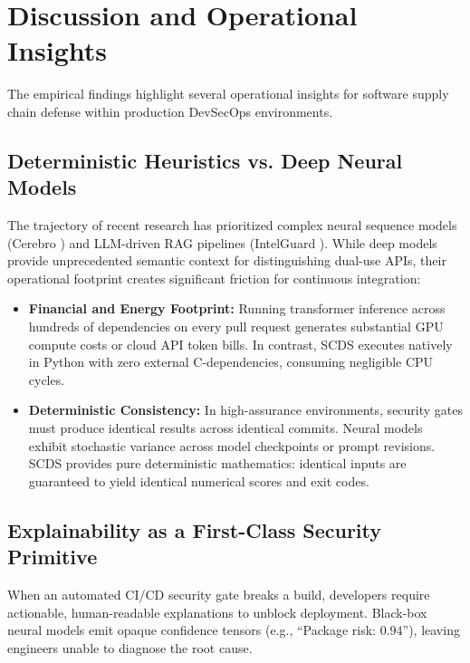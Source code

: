 \section{Discussion and Operational Insights}
\label{sec:discussion}

The empirical findings highlight several operational insights for software supply chain defense within production DevSecOps environments.

\subsection{Deterministic Heuristics vs. Deep Neural Models}
The trajectory of recent research has prioritized complex neural sequence models (Cerebro \cite{zhang2025cerebro}) and LLM-driven RAG pipelines (IntelGuard \cite{guo2026intelguard}). While deep models provide unprecedented semantic context for distinguishing dual-use APIs, their operational footprint creates significant friction for continuous integration:
\begin{itemize}
    \item \textbf{Financial and Energy Footprint:} Running transformer inference across hundreds of dependencies on every pull request generates substantial GPU compute costs or cloud API token bills. In contrast, SCDS executes natively in Python with zero external C-dependencies, consuming negligible CPU cycles.
    \item \textbf{Deterministic Consistency:} In high-assurance environments, security gates must produce identical results across identical commits. Neural models exhibit stochastic variance across model checkpoints or prompt revisions. SCDS provides pure deterministic mathematics: identical inputs are guaranteed to yield identical numerical scores and exit codes.
\end{itemize}

\subsection{Explainability as a First-Class Security Primitive}
When an automated CI/CD security gate breaks a build, developers require actionable, human-readable explanations to unblock deployment. Black-box neural models emit opaque confidence tensors (e.g., ``Package risk: $0.94$''), leaving engineers unable to diagnose the root cause.

